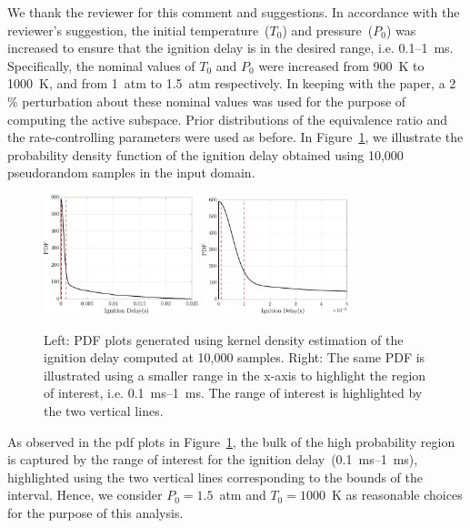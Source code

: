 \documentclass[11pt,final]{article}
\begin{document}
\begin{enumerate}[wide, labelwidth=!, labelindent=0pt]
We thank the reviewer for this comment and suggestions. In accordance with the reviewer's suggestion, the initial 
temperature~($T_0$) and pressure~($P_0$) was increased to ensure that the ignition delay is in the desired
range, i.e. 0.1--1~ms. Specifically, the nominal values of $T_0$ and $P_0$ were increased from 900~K to 1000~K, and
from 1~atm to 1.5~atm respectively. In keeping with the paper, a 2$\%$ perturbation about these nominal values was used
for the purpose of computing the active subspace. Prior distributions of the equivalence ratio and the rate-controlling
parameters were used as before. In Figure~\ref{fig:kde}, we illustrate the probability density function of the ignition delay
obtained using 10,000 pseudorandom samples in the input domain. 
%
\begin{figure}[htbp]
 \begin{center}
  \includegraphics[width=0.40\textwidth]{./Figures/pdf_ign_small}
  \includegraphics[width=0.38\textwidth]{./Figures/pdf_ign_small_zoom}
\caption{Left: PDF plots generated using kernel density estimation of the ignition delay computed at 10,000 samples.
Right: The same PDF is illustrated using a smaller range in the x-axis to highlight the region of interest, i.e. 0.1~ms--1~ms.
The range of interest is highlighted by the two vertical lines.} 
\label{fig:kde}
\end{center}
\end{figure}
%
As observed in the pdf plots in Figure~\ref{fig:kde}, the bulk of the high probability region is captured by the range of interest
for the ignition delay~(0.1~ms--1~ms), highlighted using the two vertical lines corresponding to the bounds of the interval.
Hence, we consider $P_0=1.5$~atm and $T_0=1000$~K as reasonable
choices for the purpose of this analysis. 


\end{enumerate}
\end{document}
